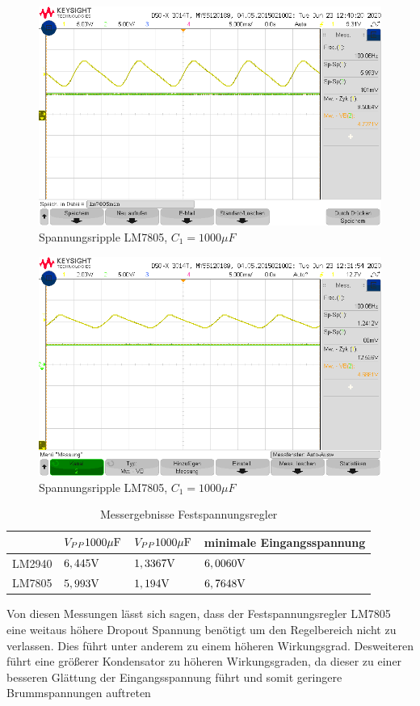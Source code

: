 \begin{figure}
    \centering
    \includegraphics[width = \costumPicWidth]{Lab_5/Messungen/lm7805min.png}
    \caption{Spannungsripple LM7805, $C_1=1000\mu F$}
    \label{fig:my_label}
\end{figure}
\begin{figure}
    \centering
    \includegraphics[width = \costumPicWidth]{Lab_5/Messungen/lm7805.4700u.png}
    \caption{Spannungsripple LM7805, $C_1=1000\mu F$}
    \label{fig:my_label}
\end{figure}
\begin{table}[H]
\centering
\caption{Messergebnisse Festspannungsregler}
\label{tab:res_Festu_reg}
\begin{tabular}{|l|l|l|l|}
\hline
\rowcolor[HTML]{9B9B9B} 
       & $V_{PP} 1000\mu\text{F}$ & $V_{PP} 1000\mu\text{F}$ & minimale Eingangsspannung \\ \hline
LM2940 & $6,445\text{V}$        & $1,3367\text{V}$       & $6,0060\text{V}$                \\ \hline
LM7805 & $5,993\text{V}$        & $1,194\text{V}$        & $6,7648\text{V}$                \\ \hline
\end{tabular}
\end{table}
Von diesen Messungen lässt sich sagen, dass der Festspannungsregler LM7805 eine weitaus höhere Dropout Spannung benötigt um den Regelbereich nicht zu verlassen. Dies führt unter anderem zu einem höheren Wirkungsgrad. Desweiteren führt eine größerer Kondensator zu höheren Wirkungsgraden, da dieser zu einer besseren Glättung der Eingangsspannung führt und somit geringere Brummspannungen auftreten

